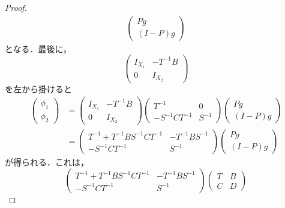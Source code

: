 \begin{proof}
\begin{equation*}
\begin{split}
\begin{pmatrix}
        Pg \\
        (I-P)g
      \end{pmatrix}
    \end{split}
  \end{equation*}
  となる．最後に，
  \begin{equation*}
    \begin{pmatrix}
      I_{X_1} & -T^{-1}B \\
      0 & I_{X_2}
    \end{pmatrix}
  \end{equation*}
  を左から掛けると
  \begin{equation*}
    \begin{split}
      \begin{pmatrix}
        \phi_1 \\
        \phi_2
      \end{pmatrix}
      &=
      \begin{pmatrix}
        I_{X_1} & -T^{-1}B \\
        0 & I_{X_2}
      \end{pmatrix}
      \begin{pmatrix}
        T^{-1} & 0 \\
        -S^{-1}CT^{-1} & S^{-1}
      \end{pmatrix}
      \begin{pmatrix}
        Pg \\
        (I-P)g
      \end{pmatrix}\\
      &=
      \begin{pmatrix}
        T^{-1}+T^{-1}BS^{-1}CT^{-1} & -T^{-1}BS^{-1} \\
        -S^{-1}CT^{-1} & S^{-1}
      \end{pmatrix}
      \begin{pmatrix}
        Pg \\
        (I-P)g
      \end{pmatrix}
    \end{split}
  \end{equation*}
  が得られる．これは，
  \begin{equation*}
    \begin{pmatrix}
      T^{-1}+T^{-1}BS^{-1}CT^{-1} & -T^{-1}BS^{-1} \\
      -S^{-1}CT^{-1} & S^{-1}
    \end{pmatrix}
    \begin{pmatrix}
      T & B \\
      C & D

\end{pmatrix}
\end{equation*}
\end{proof}
